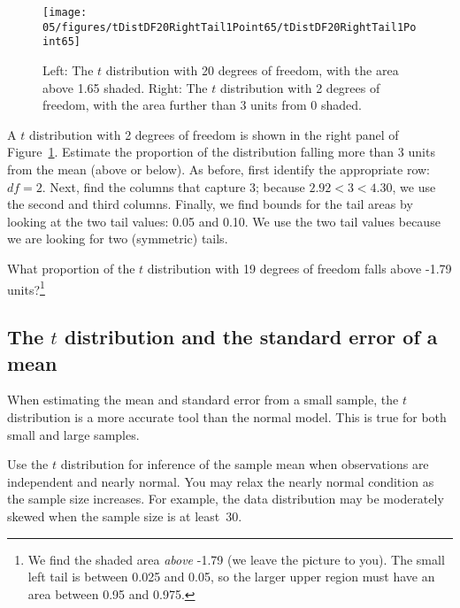 \begin{figure}
\centering
\texttt{[image: 05/figures/tDistDF20RightTail1Point65/tDistDF20RightTail1Point65]}
\caption{Left: The $t$ distribution with 20 degrees of freedom, with the area above 1.65 shaded. Right: The $t$ distribution with 2 degrees of freedom, with the area further than 3 units from 0 shaded.}
\label{tDistDF20RightTail1Point65}
\end{figure}

\begin{example}{A $t$ distribution with 2 degrees of freedom is shown in the right panel of Figure~\ref{tDistDF20RightTail1Point65}. Estimate the proportion of the distribution falling more than 3 units from the mean (above or below).}
As before, first identify the appropriate row: $df=2$. Next, find the columns that capture 3; because $2.92 < 3 < 4.30$, we use the second and third columns. Finally, we find bounds for the tail areas by looking at the two tail values: 0.05 and 0.10. We use the two tail values because we are looking for two (symmetric) tails.
\end{example}

\begin{exercise}
What proportion of the $t$ distribution with 19 degrees of freedom falls above -1.79 units?\footnote{We find the shaded area \emph{above} -1.79 (we leave the picture to you). The small left tail is between 0.025 and 0.05, so the larger upper region must have an area between 0.95 and 0.975.}


\end{exercise}



\subsection{The $t$ distribution and the standard error of a mean}
\label{tDistSolutionToSEProblem}

When estimating the mean and standard error from a small sample, the $t$ distribution is a more accurate tool than the normal model. This is true for both small and large samples.

\begin{tipBox}{
Use the $t$ distribution for inference of the sample mean when observations are independent and nearly normal. You may relax the nearly normal condition as the sample size increases. For example, the data distribution may be moderately skewed when the sample size is at least~30.
}
\end{tipBox}

